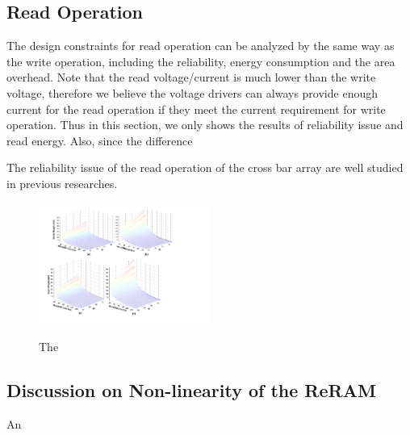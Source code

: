 \subsection{Read Operation}
The design constraints for read operation can be analyzed by the same way as the write operation, including the reliability, energy consumption and the area overhead. Note that the read voltage/current is much lower than the write voltage, therefore we believe the voltage drivers can always provide enough current for the read operation if they meet the current requirement for write operation. Thus in this section, we only shows the results of reliability issue and read energy. Also, since the difference

The reliability issue of the read operation of the cross bar array are well studied in previous researches.
%

%

\begin{figure}%
\centering
  \includegraphics[width=0.5\textwidth]{./figures/sense_margin2}\\
  \caption{The}\label{fig:sense_margin}
\end{figure}
\subsection{Discussion on Non-linearity of the ReRAM}
An
